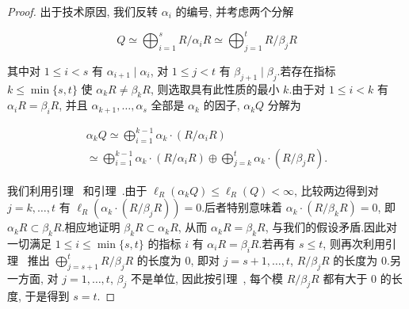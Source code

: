 \begin{proof}
出于技术原因, 我们反转 $\alpha_i$ 的编号, 并考虑两个分解

\[
Q \simeq \bigoplus_{i = 1}^{s} R/\alpha_i R \simeq \bigoplus_{j = 1}^{t} R/\beta_j R\]

其中对 $1 \leq i < s$ 有 $\alpha_{i + 1} \mid \alpha_i$, 对 $1 \leq j < t$ 有 $\beta_{j + 1} \mid \beta_j$.若存在指标 $k \leq \min\{s, t\}$ 使 $\alpha_k R \neq \beta_k R$, 则选取具有此性质的最小 $k$.由于对 $1 \leq i < k$ 有 $\alpha_i R = \beta_i R$, 并且 $\alpha_{k + 1}, \ldots, \alpha_s$ 全部是 $\alpha_k$ 的因子, $\alpha_k Q$ 分解为

\[
\begin{array}{c}
\alpha_k Q \simeq \bigoplus_{i = 1}^{k - 1} \alpha_k \cdot (R/\alpha_i R) \\
\simeq \bigoplus_{i = 1}^{k - 1} \alpha_k \cdot (R/\alpha_i R) \oplus \bigoplus_{j = k}^{t} \alpha_k \cdot (R/\beta_j R)\text{.}
\end{array}\]

我们利用引理~ 和引理~.由于 $\ell_R(\alpha_k Q) \leq \ell_R(Q) < \infty$, 比较两边得到对 $j = k, \ldots, t$ 有 $\ell_R(\alpha_k \cdot (R/\beta_j R)) = 0$.后者特别意味着 $\alpha_k \cdot (R/\beta_k R) = 0$, 即 $\alpha_k R \subset \beta_k R$.相应地证明 $\beta_k R \subset \alpha_k R$, 从而 $\alpha_k R = \beta_k R$, 与我们的假设矛盾.因此对一切满足 $1 \leq i \leq \min\{s, t\}$ 的指标 $i$ 有 $\alpha_i R = \beta_i R$.若再有 $s \leq t$, 则再次利用引理~ 推出 $\bigoplus_{j = s + 1}^{t} R/\beta_j R$ 的长度为 $0$, 即对 $j = s + 1, \ldots, t$, $R/\beta_j R$ 的长度为 $0$.另一方面, 对 $j = 1, \ldots, t$, $\beta_j$ 不是单位, 因此按引理~, 每个模 $R/\beta_j R$ 都有大于 $0$ 的长度, 于是得到 $s = t$.
\end{proof}

